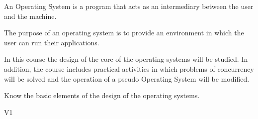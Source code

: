 \begin{syllabus}


\begin{justification}
An Operating System is a program that acts as an intermediary between the user and the machine.

The purpose of an operating system is to provide an environment in which the user can run their applications.

In this course the design of the core of the operating systems will be studied. 
In addition, the course includes practical activities in which problems of concurrency will be solved and the operation of a pseudo Operating System will be modified.
\end{justification}

\begin{goals}
	\item Know the basic elements of the design of the operating systems.
\end{goals}

\begin{outcomes}{V1}
    \item {}
    \item {}
    \item {}
\end{outcomes}

\begin{competences}
    \item {}
    \item {}
    \item {}
\end{competences}


\end{syllabus}
